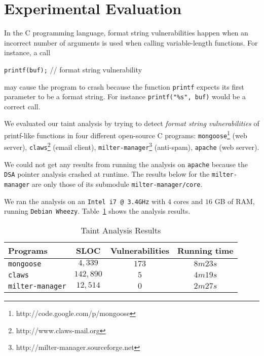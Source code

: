\section{Experimental Evaluation}\label{sec:evaluation}
In the C programming language, format string vulnerabilities
happen when an incorrect number of arguments is used when
calling variable-length functions. For instance, a call
\begin{center}
{\tt printf(buf);} // format string vulnerability
\end{center}
may cause the program to crash because the function \texttt{printf}
expects its first parameter to be a format string. For
instance {\tt printf("\%s", buf)} would be a correct call.

We evaluated our taint analysis by trying to detect
\textit{format string vulnerabilities} of printf-like functions
in four different open-source C programs: \texttt{mongoose}\footnote{http://code.google.com/p/mongoose} (web server),
\texttt{claws}\footnote{http://www.claws-mail.org} (email client),
\texttt{milter-manager}\footnote{http://milter-manager.sourceforge.net} (anti-spam),
\texttt{apache} (web server).

We could not get any results from running the analysis on
\texttt{apache} because the \texttt{DSA} pointer analysis 
crashed at runtime. 
The results below for the \texttt{milter-manager} are only those
of its submodule \texttt{milter-manager/core}.

We ran the analysis on an \texttt{Intel i7 @ 3.4GHz} with
$4$ cores and $16$ GB of RAM, running {\tt Debian Wheezy}.
Table~\ref{tab:results} shows the analysis results.

\begin{table}[!hbtp]
\centering
\begin{tabular}{|l|c|c|c|}
\hline
{\bf Programs}			&	{\bf SLOC}	& {\bf Vulnerabilities}	&	{\bf Running time}	\\ \hline
{\tt mongoose}			&	$4,339$		&	$173$	&	$8m23s$ \\ \hline
{\tt claws}				&	$142,890$ 	&	$5$		&	$4m19s$	\\ \hline
{\tt milter-manager}	&	$12,514$ 	&	$0$		&	$2m27s$\\ \hline
\end{tabular}\caption{Taint Analysis Results}\label{tab:results}
\end{table}

